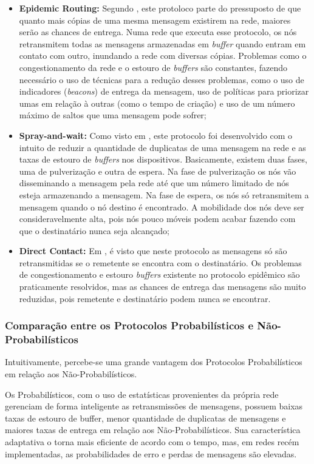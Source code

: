 \begin{itemize}
    \item \textbf{Epidemic Routing:} Segundo \cite{vahdat2000epidemic}, este protoloco parte do pressuposto de que quanto mais cópias de uma mesma mensagem existirem na rede, maiores serão as chances de entrega. Numa rede que executa esse protocolo, os nós retransmitem todas as mensagens armazenadas em \emph{buffer} quando entram em contato com outro, inundando a rede com diversas cópias. Problemas como o congestionamento da rede e o estouro de \emph{buffers} são constantes, fazendo necessário o uso de técnicas para a redução desses problemas, como o uso de indicadores (\emph{beacons}) de entrega da mensagem, uso de políticas para priorizar umas em relação à outras (como o tempo de criação) e uso de um número máximo de saltos que uma mensagem pode sofrer;
    \item \textbf{Spray-and-wait:} Como visto em \cite{spyropoulos2005spray}, este protocolo foi desenvolvido com o intuito de reduzir a quantidade de duplicatas de uma mensagem na rede e as taxas de estouro de \emph{buffers} nos dispositivos. Basicamente, existem duas fases, uma de pulverização e outra de espera. Na fase de pulverização os nós vão disseminando a mensagem pela rede até que um número limitado de nós esteja armazenando a mensagem. Na fase de espera, os nós só retransmitem a mensagem quando o nó destino é encontrado. A mobilidade dos nós deve ser consideravelmente alta, pois nós pouco móveis podem acabar fazendo com que o destinatário nunca seja alcançado;
    \item \textbf{Direct Contact:} Em \cite{spyropoulos2007spray}, é visto que neste protocolo as mensagens só são retransmitidas se o remetente se encontra com o destinatário. Os problemas de congestionamento e estouro \emph{buffers} existente no protocolo epidêmico são praticamente resolvidos, mas as chances de entrega das mensagens são muito reduzidas, pois remetente e destinatário podem nunca se encontrar.
\end{itemize}

\subsubsection{Comparação entre os Protocolos Probabilísticos e Não-Probabilísticos}

Intuitivamente, percebe-se uma grande vantagem dos Protocolos Probabilísticos em relação aos Não-Probabilísticos.

Os Probabilísticos, com o uso de estatísticas provenientes da própria rede gerenciam de forma inteligente as retransmissões de mensagens, possuem baixas taxas de estouro de buffer, menor quantidade de duplicatas de mensagens e maiores taxas de entrega em relação aos Não-Probabilísticos. Sua característica adaptativa o torna mais eficiente de acordo com o tempo, mas, em redes recém implementadas, as probabilidades de erro e perdas de mensagens são elevadas.

